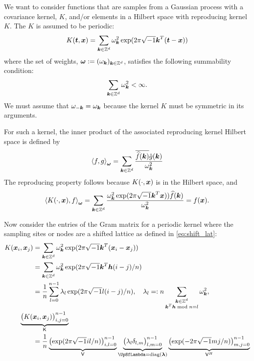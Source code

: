 \documentclass{amsart}
\begin{document}
We want to consider functions that are samples from a Gaussian process with a covariance kernel, $K$, and/or elements in a Hilbert space with reproducing kernel $K$.  The $K$ is assumed to be  periodic:
\begin{equation} \label{eq:Kseries}
    K(\vt,\vx) = \sum_{\vk \in \integers^d} \omega_{\vk}^2 \exp(2 \pi \sqrt{-1} \vk^T (\vt - \vx))
\end{equation}
where the set of weights, $\vomega : = (\omega_{\vk})_{\vk \in \integers^d}$, satisfies the following summability condition:
\begin{equation*}
    \sum_{\vk \in \integers^d} \omega_{\vk}^2 < \infty.
\end{equation*}
We must assume that $\omega_{-\vk} = \omega_{\vk}$  because the kernel $K$ must be symmetric in its arguments. 

For such a kernel, the inner product of the associated reproducing kernel Hilbert space is defined by 
\begin{equation*}
    \ip[\vomega]{f}{g} = \sum_{\vk \in \integers^d} 
    \frac{\overline{\hf(\vk)} \hg(\vk)}{\omega_{\vk}^2}
\end{equation*}
The reproducing property follows because $K(\cdot,\vx)$ is in the Hilbert space, and 
\begin{equation*}
    \ip[\vomega]{K(\cdot,\vx)}{f} 
    = \sum_{\vk \in \integers^d} 
    \frac{ \omega_{\vk}^2 \exp(2 \pi \sqrt{-1} \vk^T \vx)) \hf(\vk)}{\omega_{\vk}^2} = f(\vx).
\end{equation*}

Now consider the entries of the Gram matrix for a periodic kernel where the sampling sites or nodes are a shifted lattice as defined in \eqref{eq:shift_lat}:
\begin{align}
\nonumber
    K(\vx_i,\vx_j)  &= \sum_{\vk \in \integers^d} \omega_{\vk}^2 \exp(2 \pi \sqrt{-1} \vk^T(\vx_i - \vx_j)) \\
    \nonumber
    & = \sum_{\vk \in \integers^d} \omega_{\vk}^2 \exp(2 \pi \sqrt{-1} \vk^T \vh (i-j)/n) \\
    \label{eq:lambdaomega}
    & = \frac 1n \sum_{l = 0}^{n-1} \lambda_l \exp(2 \pi \sqrt{-1} l (i-j)/n), \quad \lambda_l =: n\sum_{\substack{\vk \in \integers^d \\ \vk^T\vh \bmod n = l}} \omega_{\vk}^2, \\
    \nonumber
    \MoveEqLeft \underbrace{\bigl ( K(\vx_i,\vx_j)\bigr)_{i,j = 0}^{n-1}}_{\mK} \\
    \nonumber
    &
    = \frac 1n \underbrace{\bigl ( \exp(2 \pi \sqrt{-1} il/n) \bigr)_{i,l = 0}^{n-1}}_{\mV} 
    \underbrace{\bigl ( \lambda_l \delta_{l,m} \bigr)_{l,m = 0}^{n-1}}_{\mLambda = \diag(\vlambda)} 
    \underbrace{\bigl ( \exp(- 2 \pi \sqrt{-1} mj/n) \bigr)_{m,j = 0}^{n-1}}_{\mV^H}
\end{align}
\end{document}

